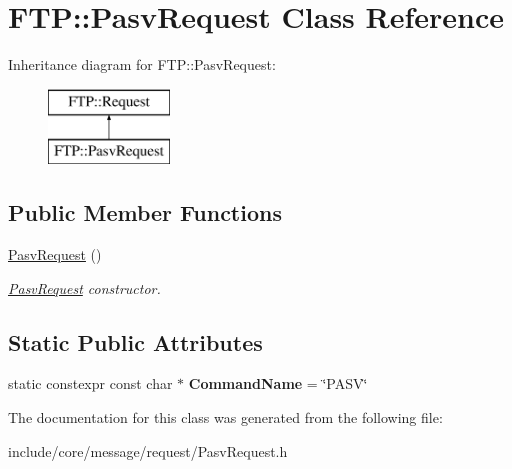 \hypertarget{class_f_t_p_1_1_pasv_request}{\section{F\-T\-P\-:\-:Pasv\-Request Class Reference}
\label{class_f_t_p_1_1_pasv_request}
}
Inheritance diagram for F\-T\-P\-:\-:Pasv\-Request\-:\begin{figure}[H]
\begin{center}
\leavevmode
\includegraphics[height=2.000000cm]{class_f_t_p_1_1_pasv_request}
\end{center}
\end{figure}
\subsection*{Public Member Functions}
\begin{DoxyCompactItemize}
\item 
\hypertarget{class_f_t_p_1_1_pasv_request_aa78463de945e73db51aebe44bad1892a}{\hyperlink{class_f_t_p_1_1_pasv_request_aa78463de945e73db51aebe44bad1892a}{Pasv\-Request} ()}\label{class_f_t_p_1_1_pasv_request_aa78463de945e73db51aebe44bad1892a}

\begin{DoxyCompactList}\small\item\em \hyperlink{class_f_t_p_1_1_pasv_request}{Pasv\-Request} constructor. \end{DoxyCompactList}\end{DoxyCompactItemize}
\subsection*{Static Public Attributes}
\begin{DoxyCompactItemize}
\item 
\hypertarget{class_f_t_p_1_1_pasv_request_a0524ca195603ca4bd0e7b33a727373e9}{static constexpr const char $\ast$ {\bfseries Command\-Name} = \char`\"{}P\-A\-S\-V\char`\"{}}\label{class_f_t_p_1_1_pasv_request_a0524ca195603ca4bd0e7b33a727373e9}

\end{DoxyCompactItemize}


The documentation for this class was generated from the following file\-:\begin{DoxyCompactItemize}
\item 
include/core/message/request/Pasv\-Request.\-h\end{DoxyCompactItemize}

